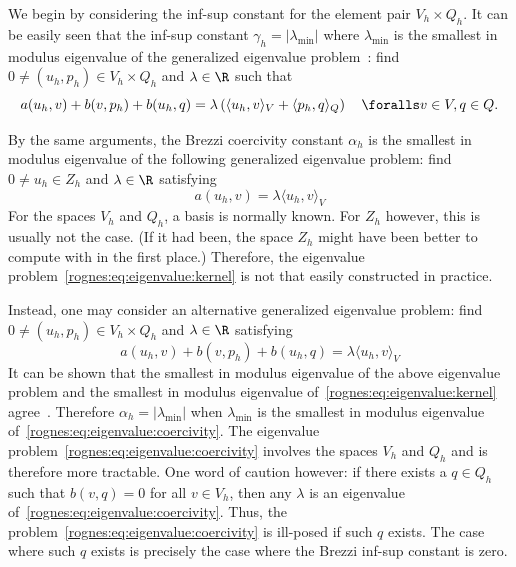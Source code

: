 We begin by considering the \babuska{} inf-sup constant for the
element pair $V_h \times Q_h$. It can be easily seen that
the \babuska{} inf-sup constant $\gamma_h = |\lambda_{\min}|$ where
$\lambda_{\min}$ is the smallest in modulus eigenvalue of the
generalized eigenvalue problem~\citep{ArnoldRognes2009, Malkus1981}:
find $0 \not = (u_h, p_h) \in V_h \times Q_h$ and $\lambda \in \R$
such that
\begin{equation}
  \label{rognes:eq:eigenvalue:babuska}
  a(u_h, v) + b(v, p_h) + b(u_h, q)
  = \lambda
  \left (\langle u_h, v \rangle_{V} + \langle p_h, q \rangle_{Q} \right )
  \quad \foralls v \in V, q \in Q.
\end{equation}

By the same arguments, the Brezzi coercivity constant $\alpha_h$ is
the smallest in modulus eigenvalue of the following generalized
eigenvalue problem: find $0 \not = u_h \in Z_h$ and $\lambda \in \R$
satisfying
\begin{equation}
  \label{rognes:eq:eigenvalue:kernel}
  a(u_h, v) = \lambda \langle u_h, v \rangle_{V}
\end{equation}
For the spaces $V_h$ and $Q_h$, a basis is normally known. For $Z_h$
however, this is usually not the case. (If it had been, the space
$Z_h$ might have been better to compute with in the first place.)
Therefore, the eigenvalue problem~\eqref{rognes:eq:eigenvalue:kernel}
is not that easily constructed in practice.

Instead, one may consider an alternative generalized eigenvalue
problem: find $0 \not = (u_h, p_h) \in V_h \times Q_h$ and $\lambda
\in \R$ satisfying
\begin{equation}
  \label{rognes:eq:eigenvalue:coercivity}
  a(u_h, v) + b(v, p_h) + b(u_h, q) = \lambda \langle u_h, v \rangle_{V}
\end{equation}
It can be shown that the smallest in modulus eigenvalue of the above
eigenvalue problem and the smallest in modulus eigenvalue
of~\eqref{rognes:eq:eigenvalue:kernel}
agree~\citep{ArnoldRognes2009}. Therefore $\alpha_h =
|\lambda_{\min}|$ when $\lambda_{\min}$ is the smallest in modulus
eigenvalue of~\eqref{rognes:eq:eigenvalue:coercivity}. The eigenvalue
problem~\eqref{rognes:eq:eigenvalue:coercivity} involves the spaces
$V_h$ and $Q_h$ and is therefore more tractable. One word of caution
however: if there exists a $q \in Q_h$ such that $b(v, q) = 0$ for all
$v \in V_h$, then any $\lambda$ is an eigenvalue
of~\eqref{rognes:eq:eigenvalue:coercivity}. Thus, the
problem~\eqref{rognes:eq:eigenvalue:coercivity} is ill-posed if such
$q$ exists. The case where such $q$ exists is precisely the case where
the Brezzi inf-sup constant is zero.

